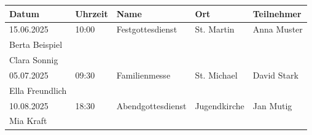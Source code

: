 \begin{tabular}{l l l l p{5.5cm}}
\textbf{Datum} & \textbf{Uhrzeit} & \textbf{Name} & \textbf{Ort} & \textbf{Teilnehmer} \\ \hline
15.06.2025 & 10:00 & Festgottesdienst & St. Martin & \fbox{\rule{0pt}{1.5ex}\rule{1.5ex}{0pt}} Anna Muster\\ \fbox{\rule{0pt}{1.5ex}\rule{1.5ex}{0pt}} Berta Beispiel\\ \fbox{\rule{0pt}{1.5ex}\rule{1.5ex}{0pt}} Clara Sonnig \\
05.07.2025 & 09:30 & Familienmesse & St. Michael & \fbox{\rule{0pt}{1.5ex}\rule{1.5ex}{0pt}} David Stark\\ \fbox{\rule{0pt}{1.5ex}\rule{1.5ex}{0pt}} Ella Freundlich \\
10.08.2025 & 18:30 & Abendgottesdienst & Jugendkirche & \fbox{\rule{0pt}{1.5ex}\rule{1.5ex}{0pt}} Jan Mutig\\ \fbox{\rule{0pt}{1.5ex}\rule{1.5ex}{0pt}} Mia Kraft \\
\end{tabular}
